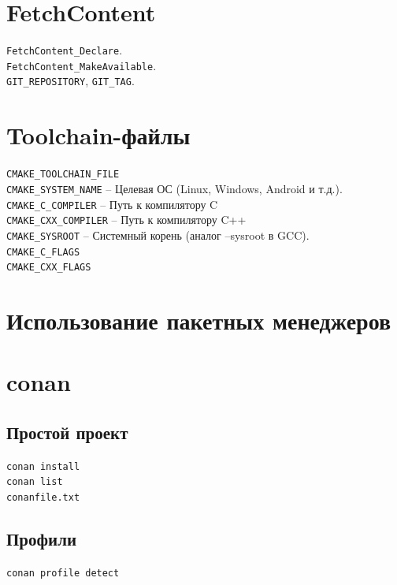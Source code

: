 \documentclass{article}
\begin{document}
\section{FetchContent}
\texttt{FetchContent\_Declare}.\\
\texttt{FetchContent\_MakeAvailable}.\\
\texttt{GIT\_REPOSITORY}, \texttt{GIT\_TAG}.

\section{Toolchain-файлы}
\texttt{CMAKE\_TOOLCHAIN\_FILE}\\

\noindent
\texttt{CMAKE\_SYSTEM\_NAME} --	Целевая ОС (Linux, Windows, Android и т.д.).\\
\texttt{CMAKE\_C\_COMPILER} --	Путь к компилятору C \\
\texttt{CMAKE\_CXX\_COMPILER} --	Путь к компилятору C++\\
\texttt{CMAKE\_SYSROOT} --	Системный корень (аналог --sysroot в GCC).\\
\texttt{CMAKE\_C\_FLAGS}\\
\texttt{CMAKE\_CXX\_FLAGS}

\section{Использование пакетных менеджеров}

\section{conan}

\subsection*{Простой проект}
\texttt{conan install}\\
\texttt{conan list}\\
\texttt{conanfile.txt}\\
\subsection*{Профили}
\texttt{conan profile detect}
\end{document}

